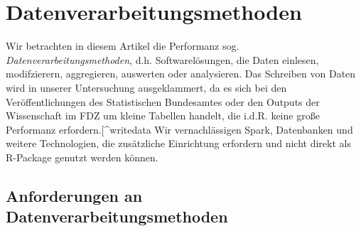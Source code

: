 \documentclass[
  german,
  10pt,
  twoside]{article}
\makeatletter
\newcommand{\berlintime}{%
  \berlinhr=\time\relax
  \divide\berlinhr by 60\relax
  \berlinmin=\time\relax
  \multiply\berlinhr by -60\relax
  \advance\berlinmin by \berlinhr\relax
  \berlinhr=\time\relax
  \divide\berlinhr by 60\relax
  \advance\berlinhr by 1\relax
  \ifnum\berlinhr>23\relax
    \advance\berlinhr by -24\relax
  \fi
  \ifnum\berlinhr<10 0\fi\the\berlinhr:\ifnum\berlinmin<10 0\fi\the\berlinmin%
}
\newif\ifdraftmode
\providecommand{\totalchars}{0}
\providecommand{\totalwords}{0}
\providecommand{\abstractchars}{0}
\providecommand{\abstractwords}{0}
\providecommand{\zusammenfassungchars}{0}
\providecommand{\zusammenfassungwords}{0}
\providecommand{\footnotecountnum}{0}
\providecommand{\citationcountnum}{0}
\newcommand{\doctitle}{$title$}
\newcommand{\docauthors}{$author-short$}
\newcommand{\docpublication}{$publication$}
\newcommand{\docpublicationissue}{$publication-issue$}
\newcommand{\metadatapage}{%
  \clearpage
  \thispagestyle{empty}
  \onecolumn
  \vspace*{1.5cm}
  
  {\raggedright
  {\LARGE\bfseries\color{wistaBlue} Dokument-Metadaten}\\[0.5cm]
  
  \begin{tabular}{@{}ll}
    \textbf{Titel:} & \doctitle \\[0.3em]
    \textbf{Autoren:} & \docauthors \\[0.3em]
    \textbf{Veröffentlichung:} & \docpublication\ \docpublicationissue \\[0.3em]
    \textbf{Erstellungsdatum:} & \today\ um \berlintime\ Uhr \\[0.3em]
  \end{tabular}
  
  \vspace{0.5cm}
  {\color{wistaBlue}\rule{\textwidth}{1pt}}
  \par}
  
  \vspace{1cm}
  
  {\large\bfseries\color{wistaDarkGray} Dokumentstatistik}\\[0.5cm]
  
  \small
  \begin{tabular}{@{}lrrrrrr@{}}
    \toprule
    \textbf{Abschnitt} & \textbf{Wörter} & \textbf{Zeichen} & \textbf{Fußn.} & \textbf{Quellen} & \textbf{Vorgabe} \\
    \midrule
    Insgesamt & \textcolor{wistaBlue}{\textbf{\totalwords}} & \textcolor{wistaBlue}{\textbf{\totalchars}} & \textcolor{wistaBlue}{\textbf{\footnotecountnum}} & \textcolor{wistaBlue}{\textbf{\citationcountnum}} & 30\,000 Z. \\
    Zusammenfassung & \textcolor{wistaBlue}{\textbf{\zusammenfassungwords}} & \textcolor{wistaBlue}{\textbf{\zusammenfassungchars}} & --- & --- & 800 Z. \\
    Abstract & \textcolor{wistaBlue}{\textbf{\abstractwords}} & \textcolor{wistaBlue}{\textbf{\abstractchars}} & --- & --- & 700 Z. \\
    \midrule
    \sectionrows
    \bottomrule
  \end{tabular}
  \normalsize
  
  \vspace{0.5cm}
  
  {\large\bfseries\color{wistaDarkGray} Schlüsselwörter}\\[0.3cm]
  \small
  \schlusselworterlist
  \normalsize
  
  \vspace{0.5cm}
  
  {\large\bfseries\color{wistaDarkGray} Keywords}\\[0.3cm]
  \small
  \keywordslist
  \normalsize
  
  \vspace{1cm}
  
  {\large\bfseries\color{wistaDarkGray} Tabellen}\\[0.3cm]
  
  \small
  \begin{tabular}{@{}lp{12cm}@{}}
    \toprule
    \textbf{Nr.} & \textbf{Beschreibung} \\
    \midrule
    \tablerows
    \bottomrule
  \end{tabular}
  \normalsize
  
  \vspace{1cm}
  
  {\large\bfseries\color{wistaDarkGray} Abbildungen}\\[0.3cm]
  
  \small
  \begin{tabular}{@{}lp{12cm}@{}}
    \toprule
    \textbf{Nr.} & \textbf{Beschreibung} \\
    \midrule
    \figurerows
    \bottomrule
  \end{tabular}
  \normalsize
  
  \clearpage
}
\makeatother
\begin{document}
\newcommand{\tablerows}{            \hyperref[tbl-pkg-versions]{Tabelle~1} & Versionen verfügbarer R-Packages \\
            \hyperref[tbl-baseline]{Tabelle~2} & Baselines in SAS und Stata (anhand 1\% des simuliertes BTP) \\
            \hyperref[tbl-benchmark-small]{Tabelle~3} & Performanz Messungen für die Fallzahlberechnung anhand 1\% des BTP \\
            \hyperref[tbl-benchmark-regr-small]{Tabelle~4} & Performanz Messungen für die Regressionsberechnung anhand 1\% des BTP \\
            \hyperref[tbl-benchmark]{Tabelle~5} & Performanz Messungen für die Fallzahlberechnung anhand 10\% des BTP \\
            \hyperref[tbl-benchmark-regr]{Tabelle~6} & Performanz Messungen für die Regressionsberechnung anhand 10\% des BTP \\
            \hyperref[tbl-bm-cnt-small]{Tabelle~7} & Benchmarkergebnisse für Fallzahlen (kleine Stichproben des BTP) \\
            \hyperref[tbl-bm-reg-small]{Tabelle~8} & Benchmarkergebnisse für Regression (kleine Stichproben des BTP) \\
}
\newcommand{\figurerows}{            \hyperref[fig-optimization-strategies]{Abbildung~1} & Strategien zur Performanz-Optimierung im FDZ-Bund \\
}
\newcommand{\schlusselworterlist}{}
\newcommand{\keywordslist}{}
\ifdraftmode
\metadatapage
\fi

\section{Datenverarbeitungsmethoden}\label{sec-methoden}

Wir betrachten in diesem Artikel die Performanz sog.
\emph{Datenverarbeitungsmethoden}, d.h. Softwarelösungen, die Daten
einlesen, modifzierern, aggregieren, auswerten oder analysieren. Das
Schreiben von Daten wird in unserer Untersuchung ausgeklammert, da es
sich bei den Veröffentlichungen des Statistischen Bundesamtes oder den
Outputs der Wissenschaft im FDZ um kleine Tabellen handelt, die i.d.R.
keine große Performanz erfordern.{[}\^{}writedata Wir vernachlässigen
Spark, Datenbanken und weitere Technologien, die zusätzliche Einrichtung
erfordern und nicht direkt als R-Package genutzt werden können.

\subsection{Anforderungen an
Datenverarbeitungsmethoden}\label{anforderungen-an-datenverarbeitungsmethoden}
\end{document}
